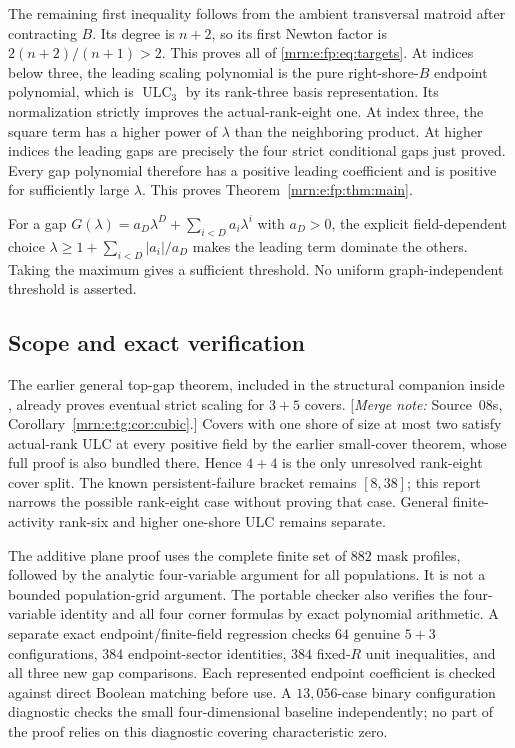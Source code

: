 \documentclass[11pt,a4paper]{article}
\theoremstyle{remark}\newtheorem{remark}[theorem]{Remark}
\newcommand{\ULC}{\operatorname{ULC}}      %
\newcommand{\mnote}[1]{[\textit{Merge note:} #1]}
\begin{document}
The remaining first inequality follows from the ambient transversal matroid after contracting $B$. Its degree is $n+2$, so its first Newton factor is $2(n+2)/(n+1)>2$. This proves all of \eqref{mrn:e:fp:eq:targets}. At indices below three, the leading scaling polynomial is the pure right-shore-$B$ endpoint polynomial, which is $\ULC_3$ by its rank-three basis representation. Its normalization strictly improves the actual-rank-eight one. At index three, the square term has a higher power of $\lambda$ than the neighboring product. At higher indices the leading gaps are precisely the four strict conditional gaps just proved. Every gap polynomial therefore has a positive leading coefficient and is positive for sufficiently large $\lambda$. This proves Theorem~\ref{mrn:e:fp:thm:main}.

For a gap $G(\lambda)=a_D\lambda^D+\sum_{i<D}a_i\lambda^i$ with $a_D>0$, the explicit field-dependent choice $\lambda\ge1+\sum_{i<D}|a_i|/a_D$ makes the leading term dominate the others. Taking the maximum gives a sufficient threshold. No uniform graph-independent threshold is asserted.

\subsection{Scope and exact verification}
The earlier general top-gap theorem, included in the structural companion inside \cite{b:m08}, already proves eventual strict scaling for $3+5$ covers. \mnote{Source~08s, Corollary~\ref{mrn:e:tg:cor:cubic}.} Covers with one shore of size at most two satisfy actual-rank ULC at every positive field by the earlier small-cover theorem, whose full proof is also bundled there. Hence $4+4$ is the only unresolved rank-eight cover split. The known persistent-failure bracket remains $[8,38]$; this report narrows the possible rank-eight case without proving that case. General finite-activity rank-six and higher one-shore ULC remains separate.

The additive plane proof uses the complete finite set of $882$ mask profiles, followed by the analytic four-variable argument for all populations. It is not a bounded population-grid argument. The portable checker also verifies the four-variable identity and all four corner formulas by exact polynomial arithmetic. A separate exact endpoint/finite-field regression checks $64$ genuine $5+3$ configurations, $384$ endpoint-sector identities, $384$ fixed-$R$ unit inequalities, and all three new gap comparisons. Each represented endpoint coefficient is checked against direct Boolean matching before use. A $13{,}056$-case binary configuration diagnostic checks the small four-dimensional baseline independently; no part of the proof relies on this diagnostic covering characteristic zero.
\end{document}
